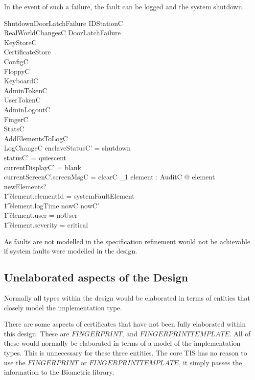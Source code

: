 In the event of such a failure, the fault can be logged and the system shutdown.

\begin{schema}{ShutdownDoorLatchFailure}
	\Delta IDStationC
\\      RealWorldChangesC
\also
        DoorLatchFailure
\\	\Xi KeyStoreC
\\	\Xi CertificateStore
\\	\Xi ConfigC
\\      \Xi FloppyC
\\      \Xi KeyboardC
\\      \Xi AdminTokenC
\\      \Xi UserTokenC
\\      AdminLogoutC
\\      \Xi FingerC
\\      \Xi StatsC
\\      AddElementsToLogC
\\      LogChangeC
\where
	enclaveStatusC' = shutdown
\\	statusC' = quiescent
\also
\\	currentDisplayC' = blank
\\	currentScreenC'.screenMsgC = clearC
\also
        \exists_1 element : AuditC @ element \in newElements? 
\\ \t1  \land element.elementId = systemFaultElement
\\ \t1  \land element.logTime \in nowC \upto nowC'
\\ \t1  \land element.user = noUser
\\ \t1  \land element.severity = critical
\end{schema}

As faults are not modelled in the specification refinement would not
be achievable if system faults were modelled in the design. 

\subsection{Unelaborated aspects of the Design}
Normally all types within the design would be elaborated in terms of
entities that  
closely model the implementation type.

There are some aspects of certificates that have not been fully
 elaborated within this  design. These are $FINGERPRINT$, and
 $FINGERPRINTTEMPLATE$. All of these would normally be elaborated in
 terms of a  model of the
 implementation types. This is unnecessary for these three
 entities. The core TIS has no reason to use  the $FINGERPRINT$ or
 $FINGERPRINTTEMPLATE$, it 
 simply passes the information to the Biometric library.

